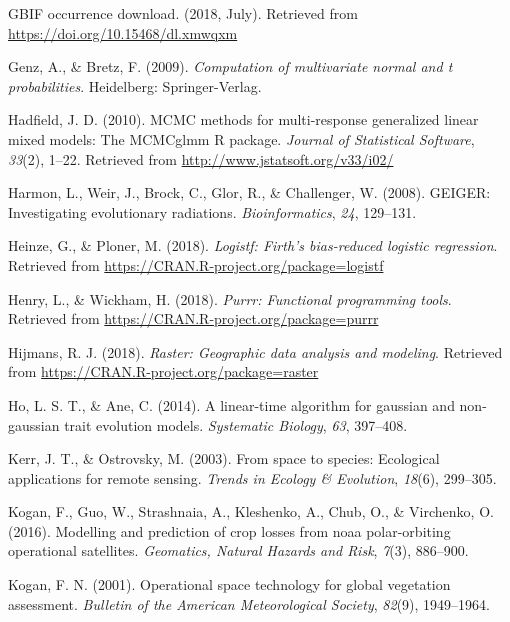 \documentclass[man,floatsintext]{apa6}
\theoremstyle{definition}
\theoremstyle{definition}
\theoremstyle{definition}
\theoremstyle{remark}
\begin{document}
\leavevmode\hypertarget{ref-gbifdownload}{}%
GBIF occurrence download. (2018, July). Retrieved from
\url{https://doi.org/10.15468/dl.xmwqxm}

\leavevmode\hypertarget{ref-R-mvtnorm}{}%
Genz, A., \& Bretz, F. (2009). \emph{Computation of multivariate normal
and t probabilities}. Heidelberg: Springer-Verlag.

\leavevmode\hypertarget{ref-R-MCMCglmm}{}%
Hadfield, J. D. (2010). MCMC methods for multi-response generalized
linear mixed models: The MCMCglmm R package. \emph{Journal of
Statistical Software}, \emph{33}(2), 1--22. Retrieved from
\url{http://www.jstatsoft.org/v33/i02/}

\leavevmode\hypertarget{ref-R-geiger_d}{}%
Harmon, L., Weir, J., Brock, C., Glor, R., \& Challenger, W. (2008).
GEIGER: Investigating evolutionary radiations. \emph{Bioinformatics},
\emph{24}, 129--131.

\leavevmode\hypertarget{ref-R-logistf}{}%
Heinze, G., \& Ploner, M. (2018). \emph{Logistf: Firth's bias-reduced
logistic regression}. Retrieved from
\url{https://CRAN.R-project.org/package=logistf}

\leavevmode\hypertarget{ref-R-purrr}{}%
Henry, L., \& Wickham, H. (2018). \emph{Purrr: Functional programming
tools}. Retrieved from \url{https://CRAN.R-project.org/package=purrr}

\leavevmode\hypertarget{ref-R-raster}{}%
Hijmans, R. J. (2018). \emph{Raster: Geographic data analysis and
modeling}. Retrieved from
\url{https://CRAN.R-project.org/package=raster}

\leavevmode\hypertarget{ref-R-phylolm}{}%
Ho, L. S. T., \& Ane, C. (2014). A linear-time algorithm for gaussian
and non-gaussian trait evolution models. \emph{Systematic Biology},
\emph{63}, 397--408.

\leavevmode\hypertarget{ref-kerr2003space}{}%
Kerr, J. T., \& Ostrovsky, M. (2003). From space to species: Ecological
applications for remote sensing. \emph{Trends in Ecology \& Evolution},
\emph{18}(6), 299--305.

\leavevmode\hypertarget{ref-kogan2016modelling}{}%
Kogan, F., Guo, W., Strashnaia, A., Kleshenko, A., Chub, O., \&
Virchenko, O. (2016). Modelling and prediction of crop losses from noaa
polar-orbiting operational satellites. \emph{Geomatics, Natural Hazards
and Risk}, \emph{7}(3), 886--900.

\leavevmode\hypertarget{ref-kogan2001operational}{}%
Kogan, F. N. (2001). Operational space technology for global vegetation
assessment. \emph{Bulletin of the American Meteorological Society},
\emph{82}(9), 1949--1964.
\end{document}
